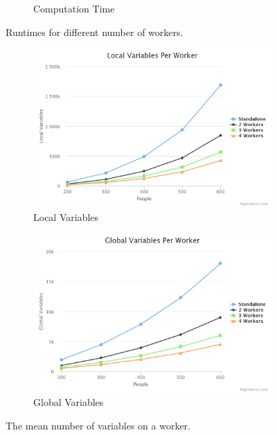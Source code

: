 \documentclass{article}
\begin{document}
\begin{figure}
\begin{subfigure}{0.50\textwidth}
                    \caption{Computation Time}
                    \label{fig:distributed-results-computation-time-worker}
                \end{subfigure}
                \caption{Runtimes for different number of workers.}
                \label{fig:distributed-results-runtimes}
            \end{figure}
            
            \begin{figure}
                \begin{subfigure}{0.50\textwidth}
                    \includegraphics[width=\textwidth]{images/localVariablesPerWorker.png}
                    \caption{Local Variables}
                    \label{fig:distributed-results-local-variables}
                \end{subfigure}
                \begin{subfigure}{0.50\textwidth}
                    \includegraphics[width=\textwidth]{images/globalVariablesPerWorker.png}
                    \caption{Global Variables}
                    \label{fig:distributed-results-global-variables}
                \end{subfigure}
                \caption{The mean number of variables on a worker.}
                \label{fig:distributed-results-variables}
            \end{figure}
            
\end{document}
